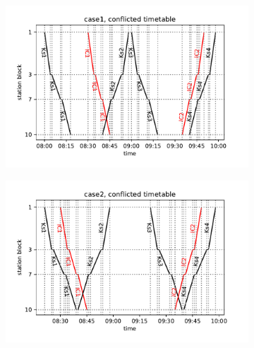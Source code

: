 \begin{figure}
  \begin{subfigure}[b]{0.5\textwidth}
    \caption{}\label{c1}
    \includegraphics[width=\textwidth]{figures/case1_conflict}
  \end{subfigure}
  \begin{subfigure}[b]{0.5\textwidth}
    \caption{}\label{c2}
    \includegraphics[width=\textwidth]{figures/case2_conflict}
  \end{subfigure}


\end{figure}
